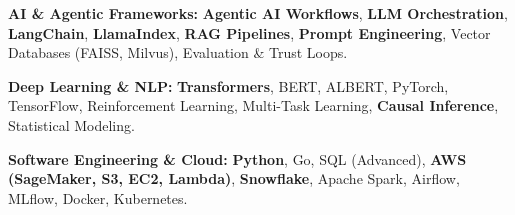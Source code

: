 \documentclass[a4paper,9pt]{extarticle} %
\begin{document}






\item \textbf{AI \& Agentic Frameworks:} \textbf{Agentic AI Workflows}, \textbf{LLM Orchestration}, \textbf{LangChain}, \textbf{LlamaIndex}, \textbf{RAG Pipelines}, \textbf{Prompt Engineering}, Vector Databases (FAISS, Milvus), Evaluation \& Trust Loops.
\item \textbf{Deep Learning \& NLP:} \textbf{Transformers}, BERT, ALBERT, PyTorch, TensorFlow, Reinforcement Learning, Multi-Task Learning, \textbf{Causal Inference}, Statistical Modeling.
\item \textbf{Software Engineering \& Cloud:} \textbf{Python}, Go, SQL (Advanced), \textbf{AWS (SageMaker, S3, EC2, Lambda)}, \textbf{Snowflake}, Apache Spark, Airflow, MLflow, Docker, Kubernetes.


\end{document}
